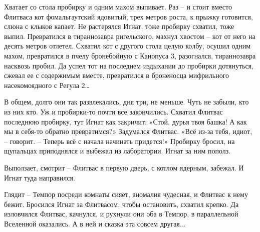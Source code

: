 \documentclass[ebook,oneside,final,openright]{memoir}
\begin{document}
\par
Хватает со стола пробирку и одним махом выпивает. Раз – и стоит вместо Флитваса кот фомальгаутский ядовитый, трех метров роста, к прыжку готовится, слюна с клыков капает. Не растерялся Игнат, тоже пробирку схватил, тоже выпил. Превратился в тираннозавра ригельского, махнул хвостом – кот от него на десять метров отлетел. Схватил кот с другого стола целую колбу, осушил одним махом, превратился в пчелу бронебойную с Канопуса 3, разогнался, тираннозавра насквозь пробил. Да успел тот на последнем издыхании до пробирки дотянуться, сжевал ее с содержимым вместе, превратился в броненосца мифрильного насекомоядного с Регула 2…\par
\par
В общем, долго они так развлекались, дня три, не меньше. Чуть не забыли, кто из них кто. Уж и пробирки-то почти все закончились. Схватил Флитвас последнюю пробирку, тут Игнат как закричит: «Стой, дурья твоя башка! А как мы в себя-то обратно превратимся?» Задумался Флитвас. «Всё из-за тебя, идиот, – говорит. – Теперь всё с начала начинать придется!» Пробирку бросил, на щупальцах приподнялся и выбежал из лаборатории. Игнат за ним пополз.\par
\par
Выползает, смотрит – Флитвас в первую дверь, с котлом ядерным, забежал. И Игнат туда направился.\par
\par
Глядит – Темпор посреди комнаты сияет, аномалия чудесная, и Флитвас к нему бежит. Бросился Игнат за Флитвасом, чтобы остановить, схватил крепко. Да изловчился Флитвас, качнулся, и рухнули они оба в Темпор, в параллельной Вселенной оказались. А в ней и сказка эта совсем другая...\par
\end{document}
